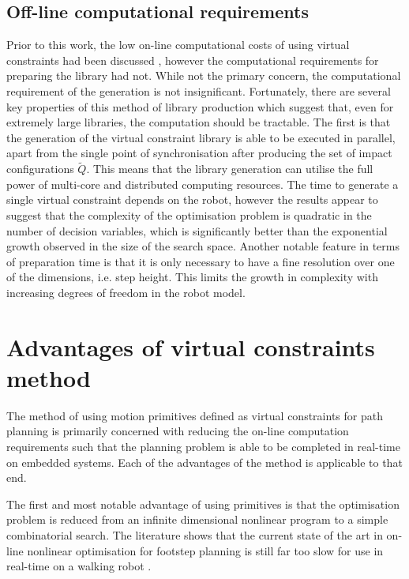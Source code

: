 \subsection{Off-line computational requirements}
Prior to this work, the low on-line computational costs of using virtual constraints had been discussed \cite{manchester13planning}, however the computational requirements for preparing the library had not. While not the primary concern, the computational requirement of the generation is not insignificant. Fortunately, there are several key properties of this method of library production which suggest that, even for extremely large libraries, the computation should be tractable. The first is that the generation of the virtual constraint library is able to be executed in parallel, apart from the single point of synchronisation after producing the set of impact configurations $\tilde{Q}$. This means that the library generation can utilise the full power of multi-core and distributed computing resources. The time to generate a single virtual constraint depends on the robot, however the results appear to suggest that the complexity of the optimisation problem is quadratic in the number of decision variables, which is significantly better than the exponential growth observed in the size of the search space. Another notable feature in terms of preparation time is that it is only necessary to have a fine resolution over one of the dimensions, i.e. step height. This limits the growth in complexity with increasing degrees of freedom in the robot model.

\section{Advantages of virtual constraints method}
The method of using motion primitives defined as virtual constraints for path planning is primarily concerned with reducing the on-line computation requirements such that the planning problem is able to be completed in real-time on embedded systems. Each of the advantages of the method is applicable to that end.

The first and most notable advantage of using primitives is that the optimisation problem is reduced from an infinite dimensional nonlinear program to a simple combinatorial search. The literature shows that the current state of the art in on-line nonlinear optimisation for footstep planning is still far too slow for use in real-time on a walking robot \cite{shkolnik2011bounding}.

